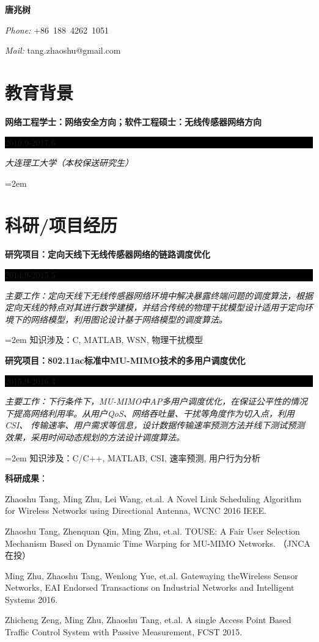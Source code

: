 \documentclass[paper=a4,fontsize=11pt]{scrartcl} %
\newcommand{\sepspace}{\vspace*{1em}}		%
\newcommand{\MyName}[1]{ %
		\Huge \usefont{OT1}{phv}{b}{n} %
         \textbf{#1} \hfill
		\normalfont\normalsize}
\newcommand{\MySlogan}[1]{ %
		\large \usefont{OT1}{phv}{m}{n} \textit{#1}
		\par \normalsize \normalfont}
\newcommand{\NewPart}[1]{\section*{\uppercase{#1}}}
\newcommand{\PersonalEntry}[2]{
		\hfill %
		\textit{#1}		       %
		#2 \par}    %
\newcommand{\EducationEntry}[4]{
		\noindent \textbf{#1} \hfill      %
		\colorbox{Black}{%
			\parbox{6em}{%
			\hfill\color{White}#2}} \par  %
		\noindent \textit{#3} \par        %
		\noindent\hangindent=2em\hangafter=0 \small #4 %
		\normalsize \par}
\begin{document}
\begin{CJK}{UTF8}{gbsn}
\vspace*{-2.3cm}
\MyName{唐兆树}
\PersonalEntry{Phone:}{+86~188~4262~1051}
\PersonalEntry{Mail:}{tang.zhaoshu@gmail.com}

\sepspace



\NewPart{教育背景}{}

\EducationEntry{网络工程学士：网络安全方向；软件工程硕士：无线传感器网络方向}{2010.9-2017.6}{大连理工大学（本校保送研究生）}{}
\vspace*{-0.7cm}
\NewPart{科研/项目经历}{}

\EducationEntry{研究项目：定向天线下无线传感器网络的链路调度优化}{2014.9-2015.5}{主要工作：定向天线下无线传感器网络环境中解决暴露终端问题的调度算法，根据定向天线的特点对其进行数学建模，并结合传统的物理干扰模型设计适用于定向环境下的网络模型，利用图论设计基于网络模型的调度算法。}{知识涉及：C, MATLAB, WSN, 物理干扰模型}
\sepspace

\EducationEntry{研究项目：802.11ac标准中MU-MIMO技术的多用户调度优化}{2015.9-2016.4}{主要工作：下行条件下，MU-MIMO中AP多用户调度优化，在保证公平性的情况下提高网络利用率。从用户QoS、网络吞吐量、干扰等角度作为切入点，利用CSI、 传输速率、用户需求等信息，设计数据传输速率预测方法并线下测试预测效果，采用时间动态规划的方法设计调度算法。}{知识涉及：C/C++, MATLAB, CSI, 速率预测, 用户行为分析}
\par
\sepspace
\noindent\textbf{科研成果}：\normalfont \normalsize\par
Zhaoshu Tang, Ming Zhu, Lei Wang, et.al. A Novel Link Scheduling Algorithm for Wireless Networks using Directional Antenna, WCNC 2016 IEEE.
\par
Zhaoshu Tang, Zhenquan Qin, Ming Zhu, et.al. TOUSE: A Fair User Selection Mechanism Based on Dynamic Time Warping for MU-MIMO Networks. （JNCA在投）
\par
Ming Zhu, Zhaoshu Tang, Wenlong Yue, et.al. Gatewaying theWireless Sensor Networks, EAI Endorsed Transactions on Industrial Networks and Intelligent Systems 2016.
\par
Zhicheng Zeng, Ming Zhu, Zhaoshu Tang, et.al. A single Access Point Based Traffic Control System with Passive Measurement, FCST 2015.


\end{CJK}
\end{document}
